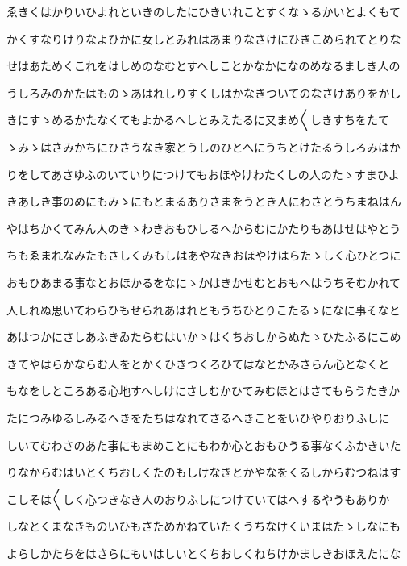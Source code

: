 \documentclass[a4paper,11pt,landscape]{ltjtarticle}
\begin{document}
\par\medskip
ゑきくはかりいひよれといきのしたにひきいれことすくなゝるかいとよくもて
\par\medskip
かくすなりけりなよひかに女しとみれはあまりなさけにひきこめられてとりな
\par\medskip
せはあためくこれをはしめのなむとすへしことかなかになのめなるましき人の
\par\medskip
うしろみのかたはものゝあはれしりすくしはかなきついてのなさけありをかし
\par\medskip
きにすゝめるかたなくてもよかるへしとみえたるに又まめ〱しきすちをたて
\par\medskip
ゝみゝはさみかちにひさうなき家とうしのひとへにうちとけたるうしろみはか
\par\medskip
りをしてあさゆふのいていりにつけてもおほやけわたくしの人のたゝすまひよ
\par\medskip
きあしき事のめにもみゝにもとまるありさまをうとき人にわさとうちまねはん
\par\medskip
やはちかくてみん人のきゝわきおもひしるへからむにかたりもあはせはやとう
\par\medskip
ちもゑまれなみたもさしくみもしはあやなきおほやけはらたゝしく心ひとつに
\par\medskip
おもひあまる事なとおほかるをなにゝかはきかせむとおもへはうちそむかれて
\par\medskip
人しれぬ思いてわらひもせられあはれともうちひとりこたるゝになに事そなと
\par\medskip
あはつかにさしあふきゐたらむはいかゝはくちおしからぬたゝひたふるにこめ
\par\medskip
きてやはらかならむ人をとかくひきつくろひてはなとかみさらん心となくと
\par\medskip
もなをしところある心地すへしけにさしむかひてみむほとはさてもらうたきか
\par\medskip
たにつみゆるしみるへきをたちはなれてさるへきことをいひやりおりふしに
\par\medskip
しいてむわさのあた事にもまめことにもわか心とおもひうる事なくふかきいた
\par\medskip
りなからむはいとくちおしくたのもしけなきとかやなをくるしからむつねはす
\par\medskip
こしそは〱しく心つきなき人のおりふしにつけていてはへするやうもありか
\par\medskip
しなとくまなきものいひもさためかねていたくうちなけくいまはたゝしなにも
\par\medskip
よらしかたちをはさらにもいはしいとくちおしくねちけかましきおほえたにな
\par\medskip
\end{document}

